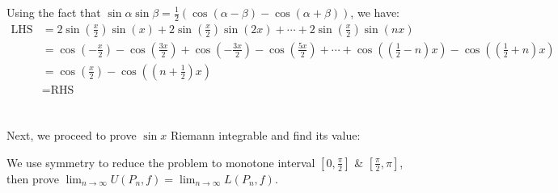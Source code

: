 \documentclass{article}
\def\to{\rightarrow}
\begin{document}
Using the fact that $\sin\alpha \sin\beta = \frac{1}{2} \left( \cos\left(\alpha - \beta\right) - \cos\left(\alpha + \beta\right) \right)$, we have:
$$\begin{aligned}
\text{LHS} &= 2\sin\left(\frac{x}{2}\right) \sin (x) + 2\sin\left(\frac{x}{2}\right) \sin (2x) + \cdots + 2\sin\left(\frac{x}{2}\right) \sin (nx) \\
&= \cos\left(-\frac{x}{2}\right) - \cos\left(\frac{3x}{2}\right) + \cos\left(-\frac{3x}{2}\right) - \cos\left(\frac{5x}{2}\right) + \cdots + \cos\left(\left(\frac{1}{2} - n\right)x\right) - \cos\left(\left(\frac{1}{2} + n\right)x\right) \\
&= \cos\left(\frac{x}{2}\right) - \cos\left(\left(n + \frac{1}{2}\right)x\right) \\
&= \text{RHS}
\end{aligned}$$
\\\\
Next, we proceed to prove $\sin x$ Riemann integrable and find its value:

We use symmetry to reduce the problem to monotone interval $[0,\frac{\pi}{2}]$ \& $[\frac{\pi}{2},\pi]$, then prove $\lim_{n\to\infty} U(P_n, f) = \lim_{n\to\infty} L(P_n, f)$.
\end{document}

